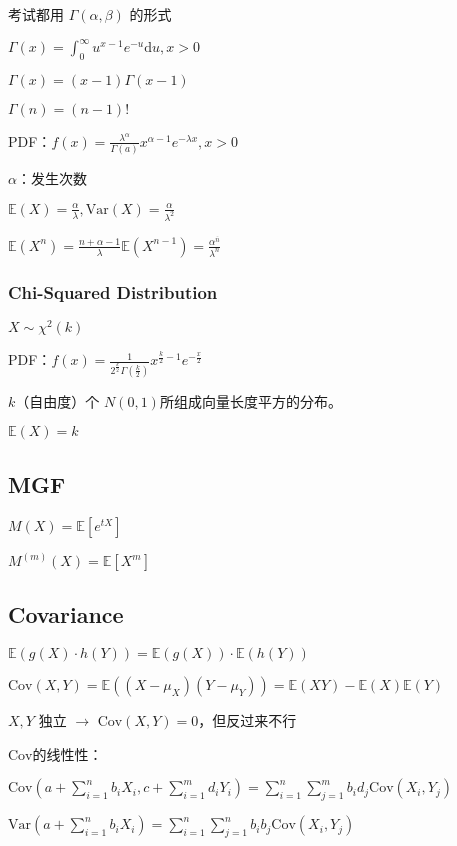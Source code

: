 \documentclass[9pt,landscape]{article}
\begin{document}
\begin{multicols}{3}
考试都用 $\Gamma(\alpha, \beta)$ 的形式

$\Gamma(x)=\int_{0}^{\infty}u^{x-1}e^{-u}\mathrm{d}u, x>0$

$\Gamma(x)=(x-1)\Gamma(x - 1)$

$\Gamma(n)=(n-1)!$

PDF：$f(x)=\frac{\lambda^\alpha}{\Gamma(a)}x^{\alpha - 1}e^{-\lambda x}, x>0$

$\alpha$：发生次数

$\mathbb{E}(X)=\frac{\alpha}{\lambda}, \mathrm{Var}(X)=\frac{\alpha}{\lambda^2}$

$\mathbb{E}(X^n)=\frac{n+\alpha-1}{\lambda}\mathbb{E}(X^{n-1})=\frac{\alpha^{\overline{n}}}{\lambda^n}$

\subsubsection{Chi-Squared Distribution}

$X\sim \chi^2(k)$

PDF：$f(x)=\frac{1}{2^{\frac{k}{2}}\Gamma\left(\frac{k}{2}\right)}x^{\frac{k}{2}-1}e^{-\frac{x}{2}}$

$k$（自由度）个 $N(0, 1)$所组成向量长度平方的分布。

$\mathbb{E}(X)=k$

\subsection{MGF}

$M(X)=\mathbb{E}\left[e^{tX}\right]$

$M^{(m)}(X)=\mathbb{E}\left[X^m\right]$

\subsection{Covariance}

$\mathbb{E}(g(X)\cdot h(Y))=\mathbb{E}(g(X))\cdot \mathbb{E}(h(Y))$

$\mathrm{Cov}(X, Y)=\mathbb{E}((X-\mu_X)(Y-\mu_Y))=\mathbb{E}(XY)-\mathbb{E}(X)\mathbb{E}(Y)$

$X, Y$ 独立 $\to$ $\mathrm{Cov}(X, Y)=0$，但反过来不行

$\mathrm{Cov}$的线性性：

$\mathrm{Cov}\left(a+\sum_{i=1}^{n}b_iX_i, c+\sum_{i=1}^{m}d_iY_i\right)=\sum_{i=1}^{n}\sum_{j=1}^{m}b_id_j\mathrm{Cov}(X_i, Y_j)$

$\mathrm{Var}\left(a+\sum_{i=1}^{n}b_iX_i\right)=\sum_{i=1}^{n}\sum_{j=1}^{n}b_ib_j\mathrm{Cov}(X_i, Y_j)$


\end{multicols}
\end{document}

